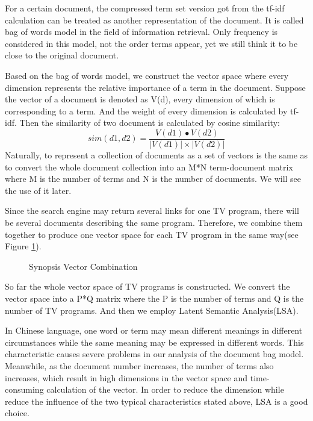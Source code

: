 For a certain document, the compressed term set version got from the tf-idf calculation can be treated as another representation of the document. It is called bag of words model in the field of information retrieval. Only frequency is considered in this model, not the order terms appear, yet we still think it to be close to the original document.

Based on the bag of words model, we construct the vector space where every dimension represents the relative importance of a term in the document. Suppose the vector of a document is denoted as V(d),  every dimension of which is corresponding to a term. And the weight of every dimension is calculated by tf-idf. Then the similarity of two document is calculated by cosine similarity:
\begin{equation}
sim(d1,d2)=\frac{V(d1)\bullet V(d2)}{|V(d1)|\times|V(d2)|}
\end{equation}
Naturally, to represent a collection of documents as a set of vectors is the same as to convert the whole document collection into an M*N term-document matrix where M is the number of terms and N is the number of documents. We will see the use of it later.

Since the search engine may return several links for one TV program, there will be several documents describing the same program.
Therefore, we combine them together to produce one vector space for each TV program in the same way(see Figure \ref{fig:vector}).

\begin{figure}
\begin{center}
\caption{\label{fig:vector}Synopsis Vector Combination}
\end{center}
\end{figure}

So far the whole vector space of TV programs is constructed. We convert the vector space into a P*Q matrix where the P is the number of terms and Q is the number of TV programs. And then we employ Latent Semantic Analysis(LSA).

In Chinese language, one word or term may mean different meanings in different circumstances while the same meaning may be expressed in different words. This characteristic causes severe problems in our analysis of the document bag model. Meanwhile, as the document number increases, the number of terms also increases, which result in high dimensions in the vector space and time-consuming calculation of the vector. In order to reduce the dimension while reduce the influence of the two typical characteristics stated above, LSA is a good choice.

